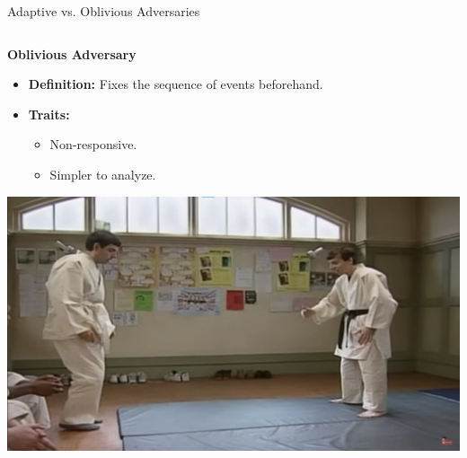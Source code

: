 \documentclass{beamer}
\begin{document}
\begin{frame}{Adaptive vs. Oblivious Adversaries}

    \begin{columns}[T] %
        \begin{column}{0.5\textwidth}
            \textbf{Oblivious Adversary}
            \begin{itemize}
                \item \textbf{Definition:} Fixes the sequence of events beforehand.
                \item \textbf{Traits:}
                \begin{itemize}
                    \item Non-responsive.
                    \item Simpler to analyze.
                \end{itemize}
            \end{itemize}
            \vspace{0.2cm}
            \includegraphics[width=\linewidth]{images/Oblivious.png}
        \end{column}
        

\end{columns}
\end{frame}
\end{document}
